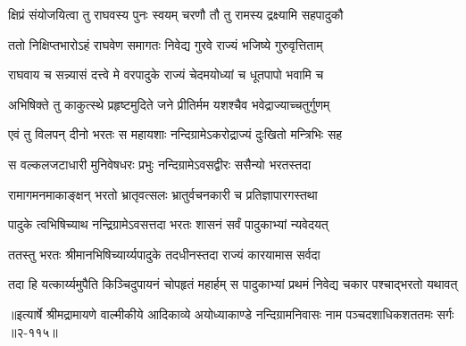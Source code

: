 \twolineshloka
{क्षिप्रं संयोजयित्वा तु राघवस्य पुनः स्वयम्}
{चरणौ तौ तु रामस्य द्रक्ष्यामि सहपादुकौ} %

\twolineshloka
{ततो निक्षिप्तभारोऽहं राघवेण समागतः}
{निवेद्य गुरवे राज्यं भजिष्ये गुरुवृत्तिताम्} %

\twolineshloka
{राघवाय च सन्न्यासं दत्त्वे मे वरपादुके}
{राज्यं चेदमयोध्यां च धूतपापो भवामि च} %

\twolineshloka
{अभिषिक्ते तु काकुत्स्थे प्रहृष्टमुदिते जने}
{प्रीतिर्मम यशश्चैव भवेद्राज्याच्चतुर्गुणम्} %

\twolineshloka
{एवं तु विलपन् दीनो भरतः स महायशाः}
{नन्दिग्रामेऽकरोद्राज्यं दुःखितो मन्त्रिभिः सह} %

\twolineshloka
{स वल्कलजटाधारी मुनिवेषधरः प्रभुः}
{नन्दिग्रामेऽवसद्वीरः ससैन्यो भरतस्तदा} %

\twolineshloka
{रामागमनमाकाङ्क्षन् भरतो भ्रातृवत्सलः}
{भ्रातुर्वचनकारी च प्रतिज्ञापारगस्तथा} %

\twolineshloka
{पादुके त्वभिषिच्याथ नन्द्रिग्रामेऽवसत्तदा}
{भरतः शासनं सर्वं पादुकाभ्यां न्यवेदयत्} %

\twolineshloka
{ततस्तु भरतः श्रीमानभिषिच्यार्य्यपादुके}
{तदधीनस्तदा राज्यं कारयामास सर्वदा} %

\twolineshloka
{तदा हि यत्कार्य्यमुपैति किञ्चिदुपायनं चोपहृतं महार्हम्}
{स पादुकाभ्यां प्रथमं निवेद्य चकार पश्चाद्भरतो यथावत्} %


॥इत्यार्षे श्रीमद्रामायणे वाल्मीकीये आदिकाव्ये अयोध्याकाण्डे नन्दिग्रामनिवासः नाम पञ्चदशाधिकशततमः सर्गः ॥२-११५॥
